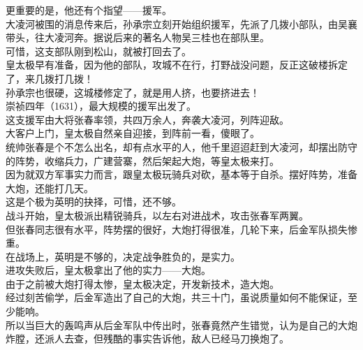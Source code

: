 \begin{multicols}{\theparacolNo}
更重要的是，他还有个指望——援军。\\

大凌河被围的消息传来后，孙承宗立刻开始组织援军，先派了几拨小部队，由吴襄带头，往大凌河奔。据说后来的著名人物吴三桂也在部队里。\\

可惜，这支部队刚到松山，就被打回去了。\\

皇太极早有准备，因为他的部队，攻城不在行，打野战没问题，反正这破楼拆定了，来几拨打几拨！\\

孙承宗也很硬，这城楼修定了，就是用人挤，也要挤进去！\\

崇祯四年（1631），最大规模的援军出发了。\\

这支援军由大将张春率领，共四万余人，奔袭大凌河，列阵迎敌。\\

大客户上门，皇太极自然亲自迎接，到阵前一看，傻眼了。\\

统帅张春是个不怎么出名，却有点水平的人，他千里迢迢赶到大凌河，却摆出防守的阵势，收缩兵力，广建营寨，然后架起大炮，等皇太极来打。\\

因为就双方军事实力而言，跟皇太极玩骑兵对砍，基本等于自杀。摆好阵势，准备大炮，还能打几天。\\

这是个极为英明的抉择，可惜，还不够。\\

战斗开始，皇太极派出精锐骑兵，以左右对进战术，攻击张春军两翼。\\

但张春同志很有水平，阵势摆的很好，大炮打得很准，几轮下来，后金军队损失惨重。\\

在战场上，英明是不够的，决定战争胜负的，是实力。\\

进攻失败后，皇太极拿出了他的实力——大炮。\\

由于之前被大炮打得太惨，皇太极决定，开发新技术，造大炮。\\

经过刻苦偷学，后金军造出了自己的大炮，共三十门，虽说质量如何不能保证，至少能响。\\

所以当巨大的轰鸣声从后金军队中传出时，张春竟然产生错觉，认为是自己的大炮炸膛，还派人去查，但残酷的事实告诉他，敌人已经马刀换炮了。\\


\end{multicols}
